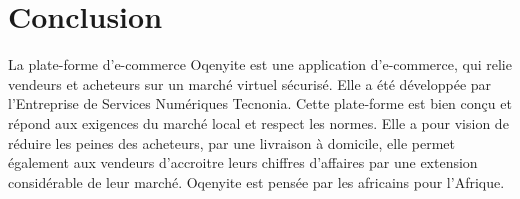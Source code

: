\chapter{Conclusion}

La plate-forme d'e-commerce Oqenyite est une application d’e-commerce, qui relie vendeurs et acheteurs sur un marché virtuel sécurisé. Elle a été développée par l’Entreprise de Services Numériques Tecnonia. Cette plate-forme est bien conçu et répond aux exigences du marché local et respect les normes. Elle a pour vision de réduire les peines des acheteurs, par une livraison à domicile, elle permet également aux vendeurs d'accroitre leurs chiffres d'affaires par une extension considérable de leur marché. Oqenyite est pensée par les africains pour l'Afrique.

